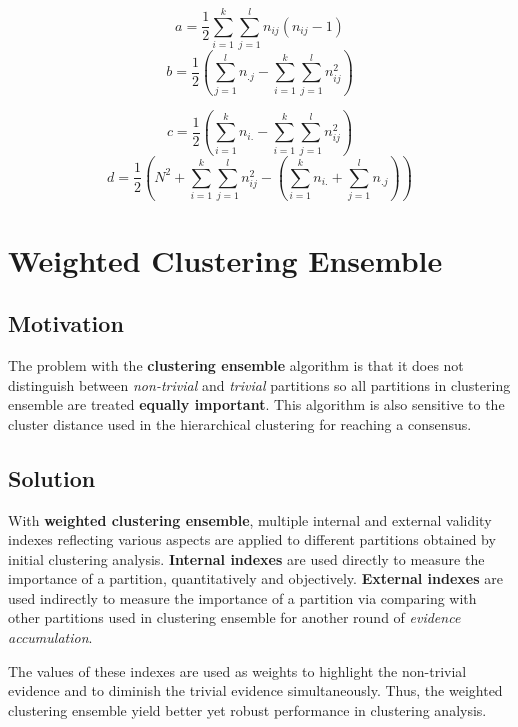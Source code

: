 \documentclass[11pt,fleqn]{book} %
\begin{document}
\begin{multicols}{2}
$$ a = \frac{1}{2}\sum^{k}_{i=1}\sum^{l}_{j=1}n_{ij}(n_{ij} - 1) $$
$$ b = \frac{1}{2}(\sum^{l}_{j=1}n_{.j} - \sum^{k}_{i=1}\sum^{l}_{j=1}n_{ij}^2)$$

$$ c = \frac{1}{2}(\sum^{k}_{i=1}n_{i.} - \sum^{k}_{i=1}\sum^{l}_{j=1}n_{ij}^2)$$
$$ d = \frac{1}{2}(N^2 + \sum^{k}_{i=1}\sum^{l}_{j=1}n_{ij}^2 - (\sum^{k}_{i=1}n_{i.} + \sum^{l}_{j=1}n_{.j}))$$
\end{multicols}

\section{Weighted Clustering Ensemble}
\subsection*{Motivation}
The problem with the \textbf{clustering ensemble} algorithm is that it does not distinguish between \textit{non-trivial} and \textit{trivial} partitions so all partitions in clustering ensemble are treated \textbf{equally important}. This algorithm is also sensitive to the cluster distance used in the hierarchical clustering for reaching a consensus.

\subsection*{Solution}
With \textbf{weighted clustering ensemble}, multiple internal and external validity indexes reflecting various aspects are applied to different partitions obtained by initial clustering analysis. \textbf{Internal indexes} are used directly to measure the importance of a partition, quantitatively and objectively. \textbf{External indexes} are used indirectly to measure the importance of a partition via comparing with other partitions used in clustering ensemble for another round of \textit{evidence accumulation}.

\noindent
The values of these indexes are used as weights to highlight the non-trivial evidence and to diminish the trivial evidence simultaneously. Thus, the weighted clustering ensemble yield better yet robust performance in clustering analysis.


\cleardoublepage
{}
\setlength{\columnsep}{0.75cm}
\printindex

\end{document}
